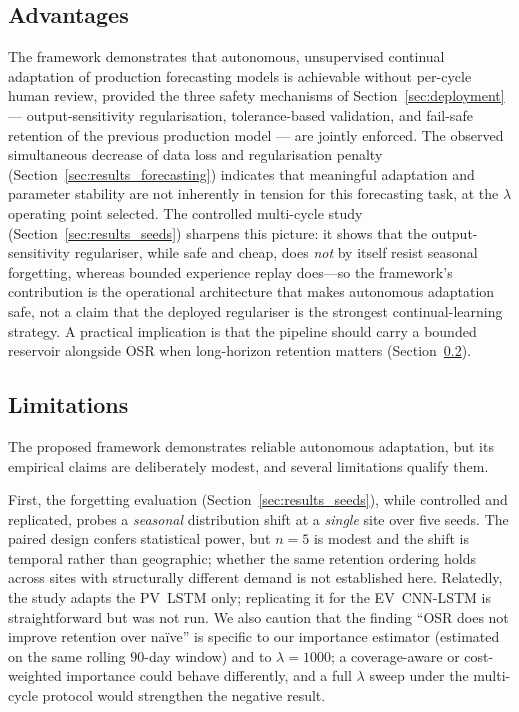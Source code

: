 \documentclass[journal]{IEEEtran}
\begin{document}
\subsection{Advantages}

The framework demonstrates that autonomous, unsupervised continual
adaptation of production forecasting models is achievable without
per-cycle human review, provided the three safety mechanisms of
Section~\ref{sec:deployment} --- output-sensitivity regularisation,
tolerance-based validation, and fail-safe retention of the previous
production model --- are jointly enforced. The observed simultaneous
decrease of data loss and regularisation penalty
(Section~\ref{sec:results_forecasting}) indicates that meaningful
adaptation and parameter stability are not inherently in tension for
this forecasting task, at the $\lambda$ operating point selected. The
controlled multi-cycle study (Section~\ref{sec:results_seeds}) sharpens
this picture: it shows that the output-sensitivity regulariser, while safe
and cheap, does \emph{not} by itself resist seasonal forgetting, whereas
bounded experience replay does---so the framework's contribution is the
operational architecture that makes autonomous adaptation safe, not a claim
that the deployed regulariser is the strongest continual-learning strategy.
A practical implication is that the pipeline should carry a bounded reservoir
alongside OSR when long-horizon retention matters
(Section~\ref{sec:limitations_fisher}).

\subsection{Limitations}
\label{sec:limitations_fisher}

The proposed framework demonstrates reliable autonomous adaptation, but
its empirical claims are deliberately modest, and several limitations
qualify them.

First, the forgetting evaluation (Section~\ref{sec:results_seeds}), while
controlled and replicated, probes a \emph{seasonal} distribution shift at a
\emph{single} site over five seeds. The paired design confers statistical
power, but $n{=}5$ is modest and the shift is temporal rather than
geographic; whether the same retention ordering holds across sites with
structurally different demand is not established here. Relatedly, the study
adapts the PV~LSTM only; replicating it for the EV~CNN-LSTM is
straightforward but was not run. We also caution that the finding
``OSR does not improve retention over na\"ive'' is specific to our
importance estimator (estimated on the same rolling $90$-day window) and to
$\lambda{=}1000$; a coverage-aware or cost-weighted importance could behave
differently, and a full $\lambda$ sweep under the multi-cycle protocol would
strengthen the negative result.
\end{document}
